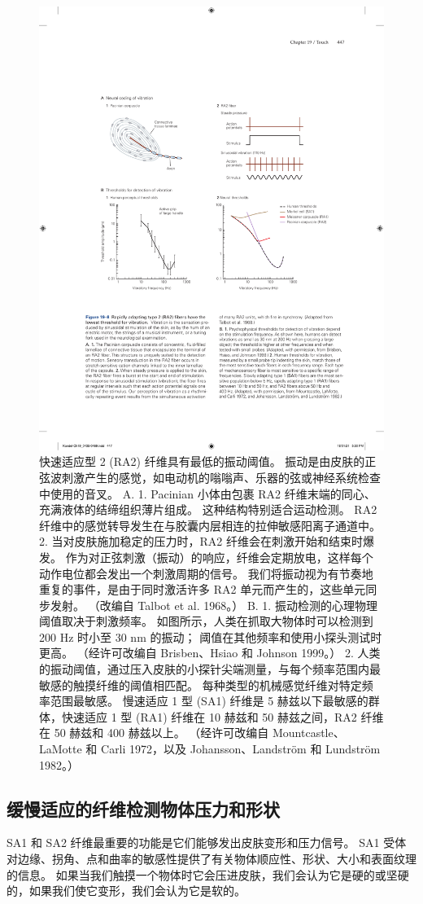 \begin{figure}[htbp]
	\centering
	\includegraphics[width=0.5\linewidth]{chap19/fig_19_8}
	\caption{快速适应型 2 (RA2) 纤维具有最低的振动阈值。 
		振动是由皮肤的正弦波刺激产生的感觉，如电动机的嗡嗡声、乐器的弦或神经系统检查中使用的音叉。 
		A. 1. Pacinian 小体由包裹 RA2 纤维末端的同心、充满液体的结缔组织薄片组成。 这种结构特别适合运动检测。 
		RA2 纤维中的感觉转导发生在与胶囊内层相连的拉伸敏感阳离子通道中。 
		2. 当对皮肤施加稳定的压力时，RA2 纤维会在刺激开始和结束时爆发。 
		作为对正弦刺激（振动）的响应，纤维会定期放电，这样每个动作电位都会发出一个刺激周期的信号。 
		我们将振动视为有节奏地重复的事件，是由于同时激活许多 RA2 单元而产生的，这些单元同步发射。 （改编自 Talbot et al. 1968。） 
		B. 1. 振动检测的心理物理阈值取决于刺激频率。 
		如图所示，人类在抓取大物体时可以检测到 200 Hz 时小至 30 nm 的振动； 阈值在其他频率和使用小探头测试时更高。 （经许可改编自 Brisben、Hsiao 和 Johnson 1999。） 
		2. 人类的振动阈值，通过压入皮肤的小探针尖端测量，与每个频率范围内最敏感的触摸纤维的阈值相匹配。 
		每种类型的机械感觉纤维对特定频率范围最敏感。 
		慢速适应 1 型 (SA1) 纤维是 5 赫兹以下最敏感的群体，快速适应 1 型 (RA1) 纤维在 10 赫兹和 50 赫兹之间，RA2 纤维在 50 赫兹和 400 赫兹以上。 （经许可改编自 Mountcastle、LaMotte 和 Carli 1972，以及 Johansson、Landström 和 Lundström 1982。）}
	\label{fig:19_8}
\end{figure}



\subsection{缓慢适应的纤维检测物体压力和形状}

SA1 和 SA2 纤维最重要的功能是它们能够发出皮肤变形和压力信号。 SA1 受体对边缘、拐角、点和曲率的敏感性提供了有关物体顺应性、形状、大小和表面纹理的信息。 如果当我们触摸一个物体时它会压进皮肤，我们会认为它是硬的或坚硬的，如果我们使它变形，我们会认为它是软的。

